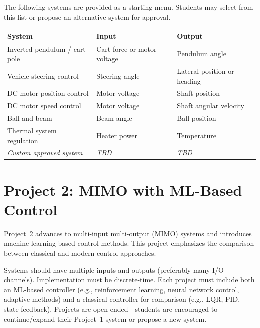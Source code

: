 \documentclass[11pt,letterpaper]{article}
\begin{document}
The following systems are provided as a starting menu. Students may select from this list or propose an alternative system for approval.

\begin{table}[htbp]
\begin{tabularx}{\linewidth}{lXX}
\toprule
\textbf{System} & \textbf{Input} & \textbf{Output} \\
\midrule
Inverted pendulum / cart-pole & Cart force or motor voltage & Pendulum angle \\
Vehicle steering control & Steering angle & Lateral position or heading \\
DC motor position control & Motor voltage & Shaft position \\
DC motor speed control & Motor voltage & Shaft angular velocity \\
Ball and beam & Beam angle & Ball position \\
Thermal system regulation & Heater power & Temperature \\
\textit{Custom approved system} & \textit{TBD} & \textit{TBD} \\
\bottomrule
\end{tabularx}
\end{table}


\section*{Project 2: MIMO with ML-Based Control}
\label{sec:project2}

Project~2 advances to multi-input multi-output (MIMO) systems and introduces machine learning-based control methods. This project emphasizes the comparison between classical and modern control approaches.

Systems should have multiple inputs and outputs (preferably many I/O channels). Implementation must be discrete-time. Each project must include both an ML-based controller (e.g., reinforcement learning, neural network control, adaptive methods) and a classical controller for comparison (e.g., LQR, PID, state feedback). Projects are open-ended---students are encouraged to continue/expand their Project~1 system or propose a new system.
\end{document}
